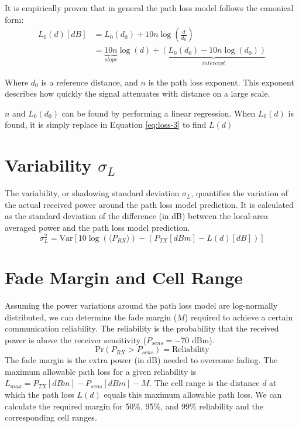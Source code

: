 It is empirically proven that in general the path loss model follows the canonical form:
\begin{align}
	L_{0}(d) [dB] &= L_0(d_0) + 10n \log\left(\frac{d}{d_0}\right)\\
				&= \underbrace{10n}_{slope} \log(d) + \underbrace{(L_0(d_0) - 10n \log(d_0))}_{intercept} \label{eq:lin-reg}
\end{align}


Where $d_0$ is a reference distance, and $n$ is the path loss exponent. This exponent describes how quickly the signal attenuates with distance on a large scale.

$n$ and $L_0(d_0)$ can be found by performing a linear regression. When $L_0(d)$ is found, it is simply replace in Equation \ref{eq:loss-3} to find $L(d)$

\section{Variability $\sigma_L$}
The variability, or shadowing standard deviation $\sigma_L$, quantifies the variation of the actual received power around the path loss model prediction. It is calculated as the standard deviation of the difference (in dB) between the local-area averaged power and the path loss model prediction.
\begin{equation}
	\sigma_L^2 = \text{Var} \left[ 10\log(\langle P_{RX} \rangle) - (P_{TX}[dBm] - L(d)[dB]) \right]
\end{equation}

\section{Fade Margin and Cell Range}
Assuming the power variations around the path loss model are log-normally distributed, we can determine the fade margin ($M$) required to achieve a certain communication reliability. The reliability is the probability that the received power is above the receiver sensitivity ($P_{sens} = -70$ dBm).
\begin{equation}
	\text{Pr}(P_{RX} > P_{sens}) = \text{Reliability}
\end{equation}
The fade margin is the extra power (in dB) needed to overcome fading. The maximum allowable path loss for a given reliability is $L_{max} = P_{TX}[dBm] - P_{sens}[dBm] - M$. The cell range is the distance $d$ at which the path loss $L(d)$ equals this maximum allowable path loss. We can calculate the required margin for 50\%, 95\%, and 99\% reliability and the corresponding cell ranges.

